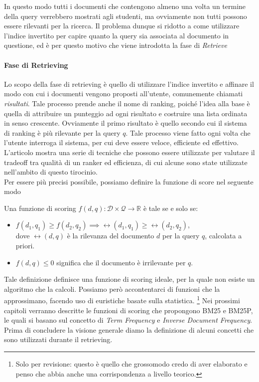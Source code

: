 In questo modo tutti i documenti che contengono almeno una volta un termine della query verrebbero mostrati
agli studenti, ma ovviamente non tutti possono essere rilevanti per la ricerca. Il problema dunque si ridotto
a come utilizzare l'indice invertito per capire quanto la query sia associata al documento in questione, ed è per questo
motivo che viene introdotta la fase di \textit{Retrieve}

\paragraph{Fase di Retrieving}
Lo scopo della fase di retrieving è quello di utilizzare l'indice invertito e affinare il modo con cui
i documenti vengono proposti all'utente, comunemente chiamati \textit{risultati}.
Tale processo prende anche il nome di ranking, poiché l'idea alla base è quella di attribuire
un punteggio ad ogni risultato e costruire una lista ordinata in senso crescente.
Ovviamente il primo risultato è quello secondo cui il sistema di ranking è più
rilevante per la query $q$. Tale processo viene fatto ogni volta che l'utente
interroga il sistema, per cui deve essere veloce, efficiente ed effettivo.
L'articolo \cite{10.1016/j.ipm.2016.05.004} mostra una serie di tecniche che possono essere
utilizzate per valutare il tradeoff tra qualità di un ranker ed efficienza, di cui alcune
sono state utilizzate nell'ambito di questo tirocinio.\\
Per essere più precisi possibile, possiamo definire la funzione di score nel seguente modo

\begin{definizione}\label{def:funzione_di_score_ideale}
	Una funzione di scoring $f(d,q) : \mathcal{D} \times \mathcal{Q} \rightarrow \mathbb{R}$ è tale
	se e solo se:
	\begin{itemize}
		\item $f(d_1,q_1) \geq f(d_2, q_2) \implies \rel(d_1, q_1) \geq \rel(d_2, q_2)$,\\ dove $\rel(d,q)$ è la rilevanza del documento $d$ per la query $q$, calcolata a priori.
		\item $f(d,q) \leq 0$ significa che il documento è irrilevante per $q$.
	\end{itemize}
\end{definizione}

Tale definizione definisce una funzione di scoring ideale, per la quale non esiste un algoritmo che
la calcoli. Possiamo però accontentarci di funzioni che la approssimano, facendo uso di euristiche basate sulla statistica. \footnote{Solo per revisione: questo è quello che grossomodo credo di aver elaborato e penso che abbia anche una corrispondenza a livello teorico. }
Nei prossimi capitoli verranno descritte le funzioni di scoring che propongono BM25 e BM25P, le quali si basano sul concetto di \textit{Term Frequency} e \textit{Inverse Document Frequency}.
Prima di concludere la visione generale diamo la definizione di alcuni concetti che sono utilizzati durante il retrieving.

